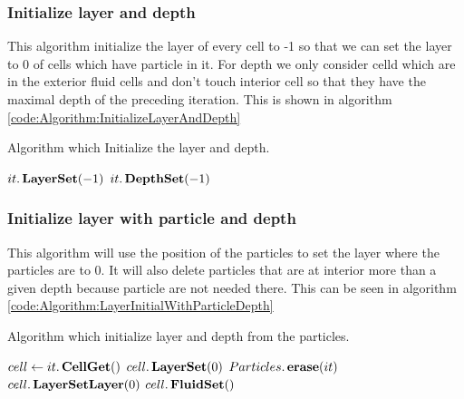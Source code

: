 \subsubsection{Initialize layer and depth}

This algorithm initialize the layer of every cell to -1 so that we can set the layer to 0 of cells which have particle in it.
For depth we only consider celld which are in the exterior fluid cells and don't touch interior cell so that they have the maximal depth
of the preceding iteration.
This is shown in algorithm \ref{code:Algorithm:InitializeLayerAndDepth}

\begin{algorithm}
\caption{Algorithm which Initialize the layer and depth.}
\label{code:Algorithm:InitializeLayerAndDepth}
\begin{algorithmic}[1]
			\State $it.\mathop{\textbf{LayerSet}}(-1)$
			 
				\State $it.\mathop{\textbf{DepthSet}}(-1)$ 
			\EndIf
\EndFor
\EndProcedure
\end{algorithmic}
\end{algorithm}

\subsubsection{Initialize layer with particle and depth}

This algorithm will use the position of the particles to set the layer where the particles are to $0$.
It will also delete particles that are at interior more than a given depth because particle are not needed there.
This can be seen in algorithm \ref{code:Algorithm:LayerInitialWithParticleDepth}

\begin{algorithm}
\caption{Algorithm which initialize layer and depth from the particles.}
\label{code:Algorithm:LayerInitialWithParticleDepth}
\begin{algorithmic}[1]
 
\State $cell \gets it.\mathop{\textbf{CellGet}}()$ 
				\State $cell.\mathop{\textbf{LayerSet}}(0)$
				 
					\State $Particles.\mathop{\textbf{erase}}(it)$ 
				\EndIf
			\Else
				\State $cell.\mathop{\textbf{LayerSetLayer}}(0)$
				\State $cell.\mathop{\textbf{FluidSet}}()$ 
			\EndIf
\EndFor
\EndProcedure
\end{algorithmic}
\end{algorithm}

